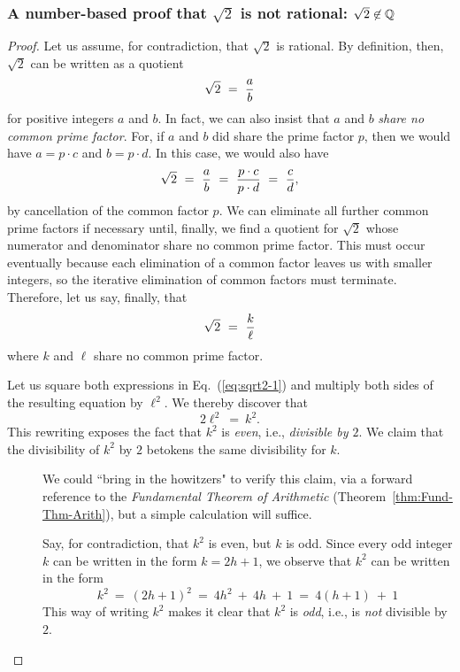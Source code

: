 \subsubsection{A number-based proof that $\sqrt{2}$ is not rational: $\sqrt{2} \not\in \mathbb{Q}$}
\label{sec:classical-proof-sqrt(2)}

\begin{proof}
Let us assume, for contradiction, that $\sqrt{2}$ is rational.  By definition, then, $\sqrt{2}$ can be written as a quotient
\[ \sqrt{2} \ = \ {a \over b} \]
for positive integers $a$ and $b$.  In fact, we can also insist that $a$ and $b$ {\em share no common prime factor}.  For, if $a$ and $b$ did share the prime factor $p$, then we would have $a = p \cdot c$ and $b = p \cdot d$.  In this case, we would also have
\[ \sqrt{2} \ = \ {a \over b} \ = \ \frac{p \cdot c}{p \cdot d} \ = \ {c \over d}, \]
by cancellation of the common factor $p$.  We can eliminate all further common prime factors if necessary until, finally, we find a quotient for $\sqrt{2}$ whose numerator and denominator share no common prime factor.  This must occur eventually because each elimination of a common factor leaves us with smaller integers, so the iterative elimination of common factors must terminate.  Therefore, let us say, finally, that
\begin{equation}
\label{eq:sqrt2-1}
\sqrt{2} \ = \ {k \over \ell}
\end{equation}
where $k$ and $\ell$ share no common prime factor.

\smallskip

Let us square both expressions in Eq.~(\ref{eq:sqrt2-1}) and multiply both sides of the resulting equation by $\ell^2$.  We thereby discover that
\begin{equation}
\label{eq:sqrt2-2}
2 \ell^2 \ = \ k^2.
\end{equation}
This rewriting exposes the fact that $k^2$ is {\em even}, i.e., {\em divisible by $2$}.  We claim that the divisibility of $k^2$ by $2$ betokens the same divisibility for $k$.
\begin{description}
\item[]
We could ``bring in the howitzers" to verify this claim, via a forward reference to the {\em Fundamental Theorem of Arithmetic} (Theorem~\ref{thm:Fund-Thm-Arith}), but a simple calculation will suffice.

\smallskip

Say, for contradiction, that $k^2$ is even, but $k$ is odd.  Since every odd integer $k$ can be written in the form $k = 2h+1$, we observe that $k^2$ can be written in the form
\[ k^2 \ = \ (2h+1)^2 \ = \ 4h^2 \ + \ 4h \ + \ 1 \ = \ 4(h+1) \ + \ 1 \]
This way of writing $k^2$ makes it clear that $k^2$ is {\em odd}, i.e., is {\em not} divisible by $2$.


\end{description}
\end{proof}

